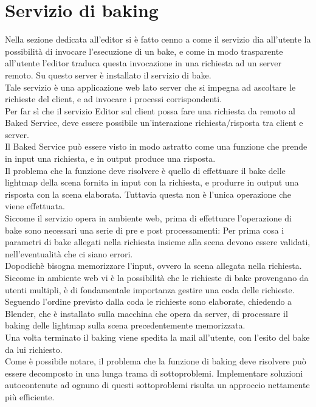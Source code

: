 \section{Servizio di baking}
\label{sec:chapter_architettura_sistema_il_servizio_baking}

Nella sezione dedicata all’editor si è fatto cenno a come il servizio dia all’utente la possibilità di invocare l’esecuzione di un bake, e come in modo trasparente all’utente l’editor traduca questa invocazione in una richiesta ad un server remoto. Su questo server è installato il servizio di bake. 
\\
Tale servizio è una applicazione web lato server che si impegna ad ascoltare le richieste del client, e ad invocare i processi corrispondenti. 
\\
Per far sì che il servizio Editor sul client possa fare una richiesta da remoto al Baked Service, deve essere possibile un’interazione richiesta/risposta tra client e server.
\\ 
Il Baked Service può essere visto in modo astratto come una funzione che prende in input una richiesta, e in output produce una risposta.
\\ 
Il problema che la funzione deve risolvere è quello di effettuare il bake delle lightmap della scena fornita in input con la richiesta, e produrre in output una risposta con la scena elaborata. Tuttavia questa non è l’unica operazione che viene effettuata. 
\\
Siccome il servizio opera in ambiente web, prima di effettuare l’operazione di bake sono necessari una serie di pre e post processamenti:
Per prima cosa i parametri di bake allegati nella richiesta insieme alla scena devono essere validati, nell’eventualità che ci siano errori. 
\\
Dopodichè bisogna memorizzare l’input, ovvero la scena allegata nella richiesta.
\\ 
Siccome in ambiente web vi è la possibilità che le richieste di bake provengano da utenti multipli, è di fondamentale importanza gestire una coda delle richieste. Seguendo l’ordine previsto dalla coda le richieste sono elaborate, chiedendo a Blender, che è installato sulla macchina che opera da server, di processare il baking delle lightmap sulla scena precedentemente memorizzata.
\\ 
Una volta terminato il baking viene spedita la mail all’utente, con l’esito del bake da lui richiesto. 
\\
Come è possibile notare, il problema che la funzione di baking deve risolvere può essere decomposto in una lunga trama di sottoproblemi. Implementare soluzioni autocontenute ad ognuno di questi sottoproblemi risulta un approccio nettamente più efficiente.
